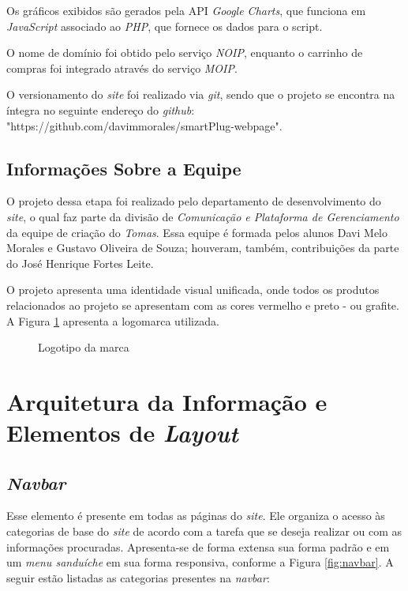 \documentclass[a4paper, 12pt]{article}
\begin{document}
Os gráficos exibidos são gerados pela API \textit{Google Charts}, que funciona em \textit{JavaScript} associado ao \textit{PHP}, que fornece os dados para o script.

O nome de domínio foi obtido pelo serviço \textit{NOIP}, enquanto o carrinho de compras foi integrado através do serviço \textit{MOIP}.

O versionamento do \textit{site} foi realizado via \textit{git}, sendo que o projeto se encontra na íntegra no seguinte endereço do \textit{github}: "https://github.com/davimmorales/smartPlug-webpage".

\subsection{Informações Sobre a Equipe}

O projeto dessa etapa foi realizado pelo departamento de desenvolvimento do \textit{site}, o qual faz parte da divisão de \textit{Comunicação e Plataforma de Gerenciamento} da equipe de criação do \textit{Tomas}. Essa equipe é formada pelos alunos Davi Melo Morales e Gustavo Oliveira de Souza; houveram, também, contribuições da parte do José Henrique Fortes Leite.

O projeto apresenta uma identidade visual unificada, onde todos os produtos relacionados ao projeto se apresentam com as cores vermelho e preto - ou grafite. A Figura \ref{fig:logo} apresenta a logomarca utilizada.

\begin{figure}[!ht]
	\centering
	\caption{Logotipo da marca}
	\label{fig:logo}
\end{figure}

\section{Arquitetura da Informação e Elementos de \textit{Layout}}

\subsection{\textit{Navbar}}

Esse elemento é presente em todas as páginas do \textit{site}. Ele organiza o acesso às categorias de base do \textit{site} de acordo com a tarefa que se deseja realizar ou com as informações procuradas. Apresenta-se de forma extensa sua forma padrão e em um \textit{menu sanduíche} em sua forma responsiva, conforme a Figura \ref{fig:navbar}. A seguir estão listadas as categorias presentes na \textit{navbar}:
\end{document}
